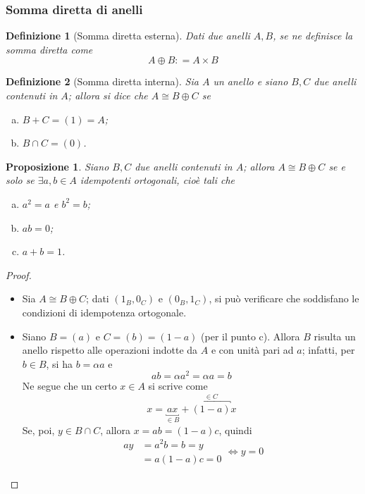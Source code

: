 \documentclass[12pt]{scrartcl}
\theoremstyle{style}
\newtheorem{definizione}{Definizione}[section]
\newtheorem{prop}{Proposizione}[section]
\theoremstyle{style1}
\numberwithin{equation}{subsection}
\begin{document}
\subsubsection{Somma diretta di anelli}
\begin{definizione}
[Somma diretta esterna]
Dati due anelli $A,B$, se ne definisce la \textit{somma diretta} come
\[
A \oplus B : = A \times B
\] 
\end{definizione}
\begin{definizione}
	[Somma diretta interna]
	Sia $A$ un anello e siano $B,C$ due anelli contenuti in $A$; allora si dice che $A \cong B \oplus C$ se
	\begin{enumerate}[(a).]
		\item $B+C = (1) = A$;
		\item $B\cap C = (0)$.
	\end{enumerate}
\end{definizione}
\begin{prop}
Siano $B,C$ due anelli contenuti in $A$; allora $A \cong B \oplus C$ se e solo se $\exists a,b\in A$ idempotenti ortogonali, cio\`e tali che
\begin{enumerate}[(a).]
	\item $a^2 = a$ e $b^2 = b$;
	\item $ab=0$;
	\item $a+b=1$.
\end{enumerate}
\end{prop}
\begin{proof}
\ 

\begin{itemize}
	\item[$(\Rightarrow)$] Sia $A\cong B \oplus C $; dati $(1_B,0_C)$ e $(0_B,1_C)$, si pu\`o verificare che soddisfano le condizioni di idempotenza ortogonale.
	\item[$(\Leftarrow)$] Siano $B = (a)$ e $C = (b) = (1-a)$ (per il punto c). 
		Allora $B$ risulta un anello rispetto alle operazioni indotte da $A$ e con unit\`a pari ad $a$; infatti, per $b \in B$, si ha $b = \alpha a$ e
		\[
		a b =\alpha a^2 = \alpha  a = b
		\] 
		Ne segue che un certo $x  \in A$ si scrive come
		\[
			x= \underbracket{a x}_{\in B}  + \overbracket{(1-a)}^{\in C} x
		\] 
Se, poi, $y \in B\cap C$, allora $x = ab =(1-a)c$, quindi
\[
	\begin{split}
		a y  &= a^2 b = b =y \\
			  &= a (1-a) c = 0
	\end{split}\iff y = 0
\] 
\end{itemize}
\end{proof}
\end{document}
